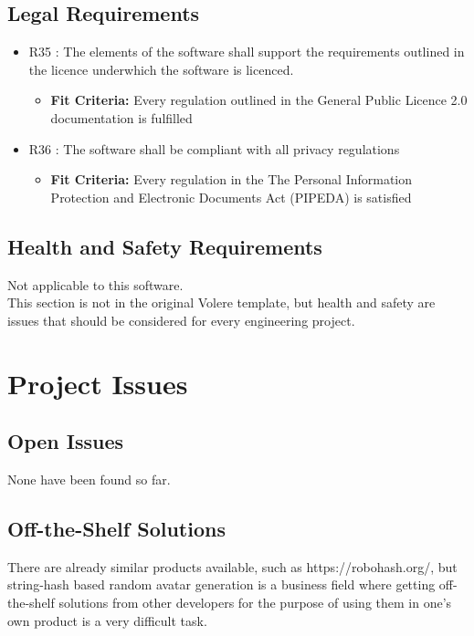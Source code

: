 \documentclass[12pt, titlepage]{article}
\begin{document}
\subsection{Legal Requirements}
\begin{itemize}
\item{R35 : The elements of the software shall support the requirements outlined in the licence underwhich the software is licenced.}
\begin{itemize}
\item{\textbf{Fit Criteria:} Every regulation outlined in the General Public Licence 2.0 documentation is fulfilled \cite{GNU}}
\end{itemize}
\item{R36 : The software shall be compliant with all privacy regulations}
\begin{itemize}
\item{\textbf{Fit Criteria:} Every regulation in the The Personal Information Protection and Electronic Documents Act (PIPEDA) is satisfied \cite{ahmad_tariq_2017}}
\end{itemize}
\end{itemize}
\subsection{Health and Safety Requirements}
Not applicable to this software. \\

This section is not in the original Volere template, but health and safety are
issues that should be considered for every engineering project.

\section{Project Issues}

\subsection{Open Issues}
None have been found so far.

\subsection{Off-the-Shelf Solutions}
There are already similar products available, such as https://robohash.org/, but
string-hash based random avatar generation is a business field where getting
off-the-shelf solutions from other developers for the purpose of using them in
one's own product is a very difficult task.
\end{document}
